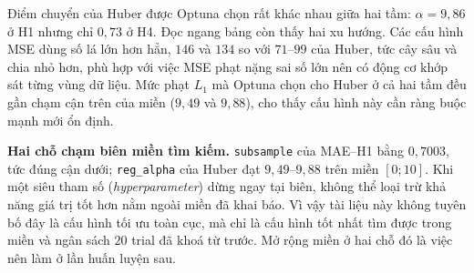 \documentclass[12pt, a4paper]{report}
\begin{document}
\begin{table}[htbp]
\centering
\caption{Bộ siêu tham số tối ưu do Optuna lựa chọn theo từng cấu hình.}
\label{tab:sieu_tham_so}
\scriptsize
{}
\end{table}

Điểm chuyển của Huber được Optuna chọn rất khác nhau giữa hai tầm: $\alpha = 9{,}86$ ở H1 nhưng
chỉ $0{,}73$ ở H4. Đọc ngang bảng còn thấy hai xu hướng. Các cấu hình MSE dùng số lá lớn hơn
hẳn, $146$ và $134$ so với $71$--$99$ của Huber, tức cây sâu và chia nhỏ hơn, phù hợp với
việc MSE phạt nặng sai số lớn nên có động cơ khớp sát từng vùng dữ liệu. Mức phạt $L_1$ mà
Optuna chọn cho Huber ở cả hai tầm đều gần chạm cận trên của miền ($9{,}49$ và $9{,}88$), cho
thấy cấu hình này cần ràng buộc mạnh mới ổn định.

\textbf{Hai chỗ chạm biên miền tìm kiếm.} \texttt{subsample} của MAE--H1 bằng $0{,}7003$, tức
đúng cận dưới; \texttt{reg\_alpha} của Huber đạt $9{,}49$--$9{,}88$ trên miền $[0;10]$. Khi một
siêu tham số (\textit{hyperparameter}) dừng ngay tại biên, không thể loại trừ khả năng giá trị tốt hơn nằm ngoài miền đã
khai báo. Vì vậy tài liệu này không tuyên bố đây là cấu hình tối ưu toàn cục, mà chỉ là cấu
hình tốt nhất tìm được trong miền và ngân sách $20$ trial đã khoá từ trước. Mở rộng miền ở hai
chỗ đó là việc nên làm ở lần huấn luyện sau.
\end{document}
